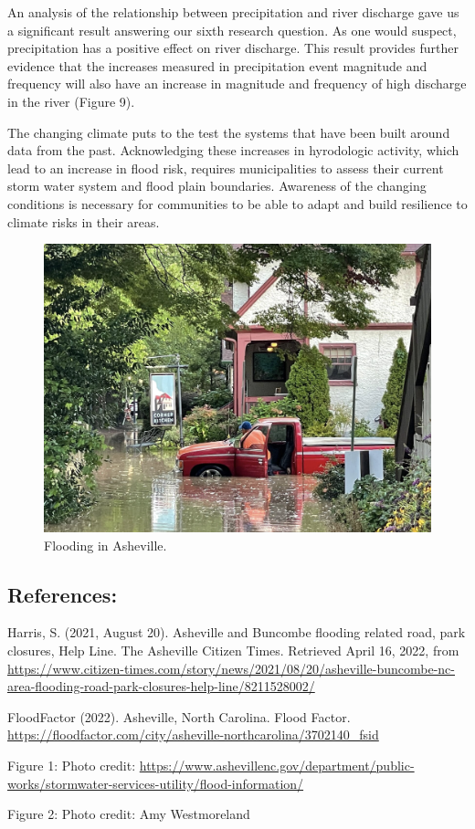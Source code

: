 \documentclass[
]{article}
\begin{document}
An analysis of the relationship between precipitation and river
discharge gave us a significant result answering our sixth research
question. As one would suspect, precipitation has a positive effect on
river discharge. This result provides further evidence that the
increases measured in precipitation event magnitude and frequency will
also have an increase in magnitude and frequency of high discharge in
the river (Figure 9).

The changing climate puts to the test the systems that have been built
around data from the past. Acknowledging these increases in hyrodologic
activity, which lead to an increase in flood risk, requires
municipalities to assess their current storm water system and flood
plain boundaries. Awareness of the changing conditions is necessary for
communities to be able to adapt and build resilience to climate risks in
their areas.

\begin{figure}

{\centering \includegraphics[width=0.75\linewidth]{Photo_1} 

}

\caption{Flooding in Asheville.}\label{fig:unnamed-chunk-17}
\end{figure}

\newpage

\hypertarget{references}{%
\subsection{\texorpdfstring{\textbf{References:}}{References:}}\label{references}}

Harris, S. (2021, August 20). Asheville and Buncombe flooding related
road, park closures, Help Line. The Asheville Citizen Times. Retrieved
April 16, 2022, from
\url{https://www.citizen-times.com/story/news/2021/08/20/asheville-buncombe-nc-area-flooding-road-park-closures-help-line/8211528002/}

FloodFactor (2022). Asheville, North Carolina. Flood Factor.
\url{https://floodfactor.com/city/asheville-northcarolina/3702140_fsid}

Figure 1: Photo credit:
\url{https://www.ashevillenc.gov/department/public-works/stormwater-services-utility/flood-information/}

Figure 2: Photo credit: Amy Westmoreland
\end{document}
